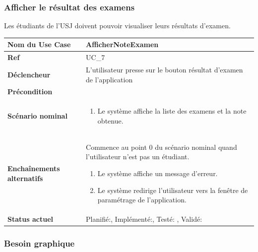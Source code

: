 								

			\subsubsection{Afficher le résultat des examens}
								Les étudiants de l'USJ doivent pouvoir visualiser leurs résultats d'examen.\\[0.2cm]
								\begin{longtable}{|l|p{10cm}|}
									\hline \textbf{Nom du Use Case} & AfficherNoteExamen \\ 
									\hline \textbf{Ref} & UC\_7  \\ 
									\hline \textbf{Déclencheur} & L'utilisateur presse sur le bouton résultat d'examen de l'application \\
									\hline \textbf{Précondition} &  \\
									\hline \textbf{Scénario nominal} & 
									\begin{enumerate}
										\item Le système affiche la liste des examens et la note obtenue. 
									\end{enumerate}
									\\ 
									\hline \textbf{Enchaînements alternatifs} & 
										Commence au point 0 du scénario  nominal quand l'utilisateur n'est pas un étudiant.
									\begin{enumerate}
										\item Le système affiche un message d'erreur.
										\item Le système redirige l'utilisateur vers la fenêtre de paramétrage de l'application.
									\end{enumerate}\\
									\hline \textbf{Status actuel} & Planifié:\CheckedBox , Implémenté:\CheckedBox  , Testé: \CheckedBox  , Validé: \CheckedBox	  \\
									\hline 
								\end{longtable} 
						\subsubsection*{Besoin graphique}
			
